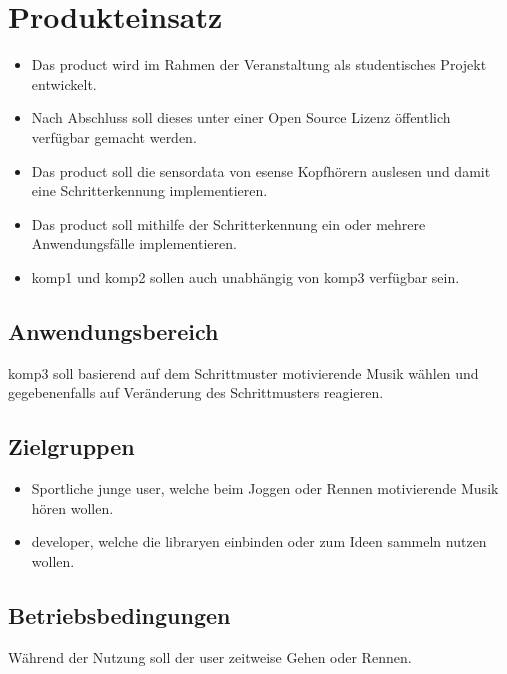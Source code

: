 \documentclass[../pflichtenheft.tex]{subfiles}
\begin{document}
	\section{Produkteinsatz}

		\begin{itemize}
			\item Das \Gls{product} wird im Rahmen der Veranstaltung  als studentisches Projekt entwickelt.
			\item Nach Abschluss soll dieses unter einer Open Source Lizenz öffentlich verfügbar gemacht werden.
			\item Das \Gls{product} soll die \Gls{sensordata} von \gls{esense} Kopfhörern auslesen und damit eine Schritterkennung
			implementieren.
			\item Das \Gls{product} soll mithilfe der Schritterkennung ein oder mehrere Anwendungsfälle implementieren.
			\item \Gls{komp1} und \Gls{komp2} sollen auch unabhängig von \Gls{komp3} verfügbar sein.
		\end{itemize}

		\subsection{Anwendungsbereich}
			\Gls{komp3} soll basierend auf dem Schrittmuster motivierende Musik wählen und gegebenenfalls auf Veränderung des Schrittmusters reagieren.

		\subsection{Zielgruppen}
			\begin{itemize}
				\item Sportliche junge \Gls{user}, welche beim Joggen oder Rennen motivierende Musik hören wollen.
				\item \Gls{developer}, welche die \Gls{library}en einbinden oder zum Ideen sammeln nutzen wollen.
			\end{itemize}

		\subsection{Betriebsbedingungen}
			Während der Nutzung soll der \Gls{user} zeitweise Gehen oder Rennen.
\end{document}
